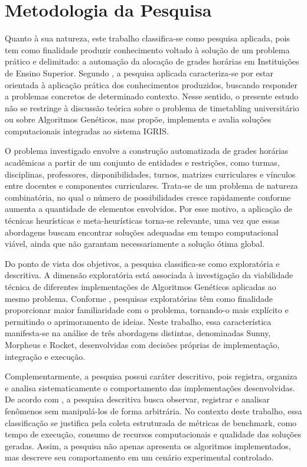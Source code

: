 ﻿\section{Metodologia da Pesquisa}
\label{sec:3.1}

Quanto à sua natureza, este trabalho classifica-se como pesquisa aplicada, pois tem como finalidade produzir conhecimento voltado à solução de um problema prático e delimitado: a automação da alocação de grades horárias em Instituições de Ensino Superior. Segundo , a pesquisa aplicada caracteriza-se por estar orientada à aplicação prática dos conhecimentos produzidos, buscando responder a problemas concretos de determinado contexto. Nesse sentido, o presente estudo não se restringe à discussão teórica sobre o problema de timetabling universitário ou sobre Algoritmos Genéticos, mas propõe, implementa e avalia soluções computacionais integradas ao sistema IGRIS.

O problema investigado envolve a construção automatizada de grades horárias acadêmicas a partir de um conjunto de entidades e restrições, como turmas, disciplinas, professores, disponibilidades, turnos, matrizes curriculares e vínculos entre docentes e componentes curriculares. Trata-se de um problema de natureza combinatória, no qual o número de possibilidades cresce rapidamente conforme aumenta a quantidade de elementos envolvidos. Por esse motivo, a aplicação de técnicas heurísticas e meta-heurísticas torna-se relevante, uma vez que essas abordagens buscam encontrar soluções adequadas em tempo computacional viável, ainda que não garantam necessariamente a solução ótima global.

Do ponto de vista dos objetivos, a pesquisa classifica-se como exploratória e descritiva. A dimensão exploratória está associada à investigação da viabilidade técnica de diferentes implementações de Algoritmos Genéticos aplicadas ao mesmo problema. Conforme , pesquisas exploratórias têm como finalidade proporcionar maior familiaridade com o problema, tornando-o mais explícito e permitindo o aprimoramento de ideias. Neste trabalho, essa característica manifesta-se na análise de três abordagens distintas, denominadas Sunny, Morpheus e Rocket, desenvolvidas com decisões próprias de implementação, integração e execução.

Complementarmente, a pesquisa possui caráter descritivo, pois registra, organiza e analisa sistematicamente o comportamento das implementações desenvolvidas. De acordo com , a pesquisa descritiva busca observar, registrar e analisar fenômenos sem manipulá-los de forma arbitrária. No contexto deste trabalho, essa classificação se justifica pela coleta estruturada de métricas de benchmark, como tempo de execução, consumo de recursos computacionais e qualidade das soluções geradas. Assim, a pesquisa não apenas apresenta os algoritmos implementados, mas descreve seu comportamento em um cenário experimental controlado.

